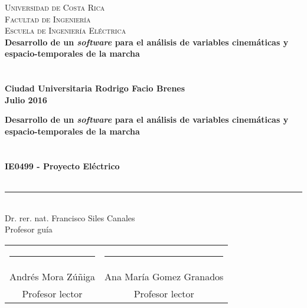 \documentclass[11pt, letterpaper, twoside, openright]{book}
\begin{document}
\frontmatter
\pagestyle{plain}

\thispagestyle{empty}
\begin{center}
     \Large\textsc{Universidad de Costa Rica \\ Facultad de Ingeniería \\ Escuela de Ingeniería Eléctrica} \\
    \vspace{6cm}
    \LARGE\bfseries{Desarrollo de un \emph{software} para el análisis de variables cinemáticas y espacio-temporales de la marcha} \\
    \vspace{2cm}
    \large{} \\
    \vspace{0.5cm}
    \Large{} \\
    \vfill
    \large{Ciudad Universitaria Rodrigo Facio Brenes}\\
    \vspace{0.5cm}
    \large{Julio 2016}
\end{center}
\newpage\null\thispagestyle{empty}\newpage
\thispagestyle{empty}
\begin{center}
    \LARGE\bfseries{Desarrollo de un \emph{software} para el análisis de variables cinemáticas y espacio-temporales de la marcha} \\
    \vspace{2cm}
    \large{} \\
    \vspace{0.5cm}
    \Large{} \\
    \vfill
    \large\bfseries{IE0499 - Proyecto Eléctrico} \\
    \vspace{0.5cm}
    \large{} \\
    \vspace{4cm}
    \rule{6cm}{0.1pt}\\
    \normalfont\large{Dr. rer. nat. Francisco Siles Canales} \\
    \normalfont\large{Profesor guía} \\
    \vspace{2cm} 
    \begin{table}[!h]
        \centering
        \begin{tabular}{cc}
            \rule{6cm}{0.1pt}  & \rule{6cm}{0.1pt} \\
            Andrés Mora Zúñiga & Ana María Gomez Granados \\
            Profesor lector    & Profesor lector \\
        \end{tabular}
    \end{table}
\end{center}
\end{document}
